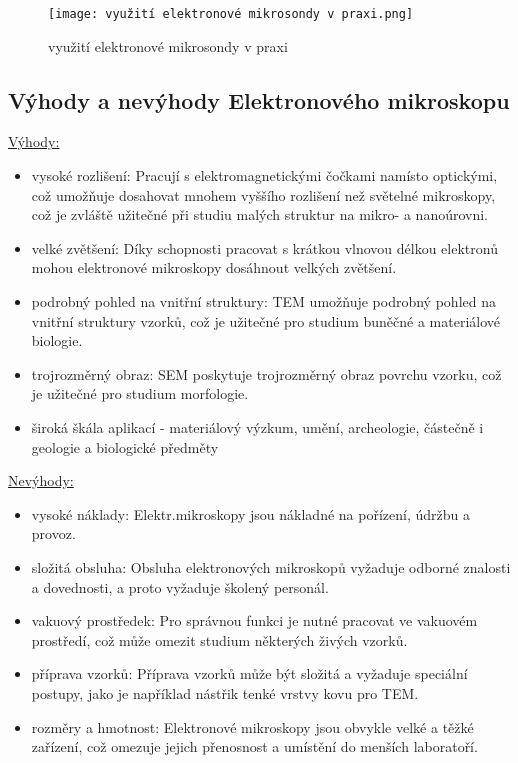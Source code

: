 \begin{figure}[ht!]
    \centering
    \texttt{[image: využití elektronové mikrosondy v praxi.png]}
    \caption{využití elektronové mikrosondy v praxi}
\end{figure}

\subsection{Výhody a nevýhody Elektronového mikroskopu}

\underline{Výhody:}
\begin{itemize}
    \item vysoké rozlišení: Pracují s elektromagnetickými čočkami namísto optickými, což umožňuje dosahovat mnohem vyššího rozlišení než světelné mikroskopy, což je zvláště užitečné při studiu malých struktur na mikro- a nanoúrovni.
    \item velké zvětšení: Díky schopnosti pracovat s krátkou vlnovou délkou elektronů mohou elektronové mikroskopy dosáhnout velkých zvětšení.
    \item podrobný pohled na vnitřní struktury: TEM umožňuje podrobný pohled na vnitřní struktury vzorků, což je užitečné pro studium buněčné a materiálové biologie.
    \item trojrozměrný obraz: SEM poskytuje trojrozměrný obraz povrchu vzorku, což je užitečné pro studium morfologie.
    \item široká škála aplikací - materiálový výzkum, umění, archeologie, částečně i geologie a biologické předměty

\end{itemize}

\underline{Nevýhody:}
\begin{itemize}
    \item vysoké náklady: Elektr.mikroskopy jsou nákladné na pořízení, údržbu a provoz.
    \item složitá obsluha: Obsluha elektronových mikroskopů vyžaduje odborné znalosti a dovednosti, a proto vyžaduje školený personál.
    \item vakuový prostředek: Pro správnou funkci je nutné pracovat ve vakuovém prostředí, což může omezit studium některých živých vzorků.
    \item příprava vzorků: Příprava vzorků může být složitá a vyžaduje speciální postupy, jako je například nástřik tenké vrstvy kovu pro TEM.
    \item rozměry a hmotnost: Elektronové mikroskopy jsou obvykle velké a těžké zařízení, což omezuje jejich přenosnost a umístění do menších laboratoří.
\end{itemize}


